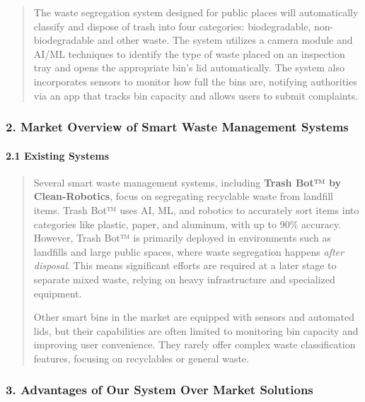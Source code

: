 \documentclass[
]{article}
\begin{document}
\begin{quote}
The waste segregation system designed for public places will
automatically classify and dispose of trash into four categories:
biodegradable, non-biodegradable and other waste. The system utilizes a
camera module and AI/ML techniques to identify the type of waste placed
on an inspection tray and opens the appropriate bin's lid automatically.
The system also incorporates sensors to monitor how full the bins are,
notifying authorities via an app that tracks bin capacity and allows
users to submit complaints.
\end{quote}

\hypertarget{market-overview-of-smart-waste-management-systems}{%
\subsubsection{2. Market Overview of Smart Waste Management
Systems}\label{market-overview-of-smart-waste-management-systems}}

\hypertarget{existing-systems}{%
\paragraph{2.1 Existing Systems}\label{existing-systems}}

\begin{quote}
Several smart waste management systems, including \textbf{Trash Bot™ by
Clean-Robotics}, focus on segregating recyclable waste from landfill
items. Trash Bot™ uses AI, ML, and robotics to accurately sort items
into categories like plastic, paper, and aluminum, with up to 90\%
accuracy. However, Trash Bot™ is primarily deployed in environments such
as landfills and large public spaces, where waste segregation happens
\emph{after disposal}. This means significant efforts are required at a
later stage to separate mixed waste, relying on heavy infrastructure and
specialized equipment.

Other smart bins in the market are equipped with sensors and automated
lids, but their capabilities are often limited to monitoring bin
capacity and improving user convenience. They rarely offer complex waste
classification features, focusing on recyclables or general waste.
\end{quote}

\hypertarget{advantages-of-our-system-over-market-solutions}{%
\subsubsection{3. Advantages of Our System Over Market
Solutions}\label{advantages-of-our-system-over-market-solutions}}
\end{document}
